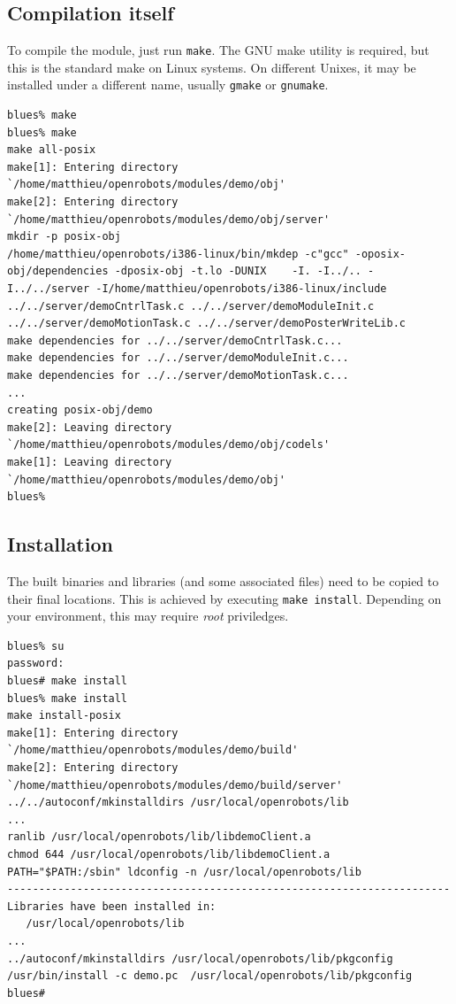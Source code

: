 \subsection{Compilation itself}

To compile the module, just run \texttt{make}. The GNU make utility is
required, but this is the standard make on Linux systems. On different
Unixes, it may be installed under a different name, usually
\texttt{gmake} or \texttt{gnumake}.

\begin{center}
\begin{cartouche}\small
\begin{verbatim}
blues% make
blues% make
make all-posix
make[1]: Entering directory `/home/matthieu/openrobots/modules/demo/obj'
make[2]: Entering directory `/home/matthieu/openrobots/modules/demo/obj/server'
mkdir -p posix-obj
/home/matthieu/openrobots/i386-linux/bin/mkdep -c"gcc" -oposix-obj/dependencies -dposix-obj -t.lo -DUNIX    -I. -I../.. -I../../server -I/home/matthieu/openrobots/i386-linux/include   ../../server/demoCntrlTask.c ../../server/demoModuleInit.c ../../server/demoMotionTask.c ../../server/demoPosterWriteLib.c
make dependencies for ../../server/demoCntrlTask.c...
make dependencies for ../../server/demoModuleInit.c...
make dependencies for ../../server/demoMotionTask.c...
...
creating posix-obj/demo
make[2]: Leaving directory `/home/matthieu/openrobots/modules/demo/obj/codels'
make[1]: Leaving directory `/home/matthieu/openrobots/modules/demo/obj'
blues%
\end{verbatim}
\end{cartouche}
\end{center}

\subsection{Installation}
The built binaries and libraries (and some associated files) need to
be copied to their final locations. This is achieved by executing
\texttt{make install}. Depending on your environment, this may require
\emph{root} priviledges.

\begin{center}
\begin{cartouche}\small
\begin{verbatim}
blues% su
password:
blues# make install
blues% make install
make install-posix
make[1]: Entering directory `/home/matthieu/openrobots/modules/demo/build'
make[2]: Entering directory `/home/matthieu/openrobots/modules/demo/build/server'
../../autoconf/mkinstalldirs /usr/local/openrobots/lib
...
ranlib /usr/local/openrobots/lib/libdemoClient.a
chmod 644 /usr/local/openrobots/lib/libdemoClient.a
PATH="$PATH:/sbin" ldconfig -n /usr/local/openrobots/lib
----------------------------------------------------------------------
Libraries have been installed in:
   /usr/local/openrobots/lib
...
../autoconf/mkinstalldirs /usr/local/openrobots/lib/pkgconfig
/usr/bin/install -c demo.pc  /usr/local/openrobots/lib/pkgconfig
blues# 
\end{verbatim}%
\end{cartouche}
\end{center}
